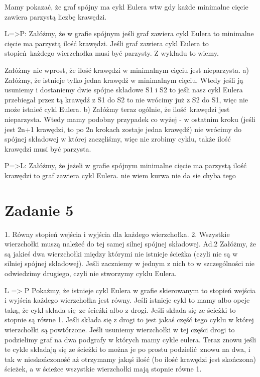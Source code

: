 \documentclass[12pt]{article}
\begin{document}
Mamy pokazać, że graf spójny ma cykl Eulera wtw gdy każde minimalne cięcie zawiera parzystą liczbę krawędzi.

L=>P:
Załóżmy, że w grafie spójnym jeśli graf zawiera cykl Eulera to minimalne cięcie ma parzystą ilość krawędzi.
Jeśli graf zawiera cykl Eulera to stopień każdego wierzchołka musi być parzysty. Z wykładu to wiemy.

Załóżmy nie wprost, że ilość krawędzi w minimalnym cięciu jest nieparzysta.
a) Załóżmy, że istnieje tylko jedna krawędź w minimalnym cięciu. Wtedy jeśli ją usuniemy i dostaniemy dwie spójne składowe S1 i S2 to jeśli nasz cykl Eulera przebiegał przez tą krawędź z S1 do S2 to nie wrócimy już z S2 do S1, więc nie może istnieć cykl Eulera. 
b) Załóżmy teraz ogólnie, że ilość krawędzi jest nieparzysta. Wtedy mamy podobny przypadek co wyżej - w ostatnim kroku (jeśli jest 2n+1 krawędzi, to po 2n krokach zostaje jedna krawędź) nie wrócimy do spójnej składowej w której zaczęliśmy, więc nie zrobimy cyklu, także ilość krawędzi musi być parzysta.


P=>L:
Załóżmy, że jeżeli w grafie spójnym minimalne cięcie ma parzystą ilość krawędzi to graf zawiera cykl Eulera.
nie wiem kurwa nie da sie chyba tego




\section{Zadanie 5}%
1. Równy stopień wejścia i wyjścia dla każdego wierzchołka.
2. Wszystkie wierzchołki muszą należeć do tej samej silnej spójnej składowej. 
Ad.2 
Załóżmy, że są jakieś dwa wierzchołki między którymi nie istnieje ścieżka (czyli nie są w silniej spójnej składowej). Jeśli zaczniemy w jednym z nich to w szczególności nie odwiedzimy drugiego, czyli nie stworzymy cyklu Eulera.

L => P
Pokażmy, że istnieje cykl Eulera w grafie skierowanym to stopień wejścia i wyjścia każdego wierzchołka jest równy.
Jeśli istnieje cykl to mamy albo opcje taką, że cykl składa się ze ścieżki albo z drogi.
Jeśli składa się ze ścieżki to stopnie są równe 1.
Jeśli składa się z drogi to jest jakaś część tego cyklu w której wierzchołki są powtórzone. Jeśli usuniemy wierzchołki w tej części drogi to podzielimy graf na dwa podgrafy w których mamy cykle eulera. Teraz znowu jeśli te cykle składają się ze ścieżki to można je po prostu podzielić znowu na dwa, i tak w nieskończoność aż otrzymamy jakąś ilość (bo ilość krawędzi jest skończona) ścieżek, a w ścieżce wszystkie wierzchołki mają stopnie równe 1.
\end{document}
